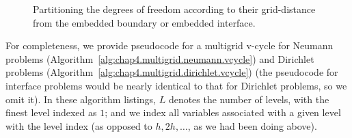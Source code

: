 \setlength{\figurewidth}{0.50\textwidth}
\begin{figure}[htbp]
\centering
{}
\caption{Partitioning the degrees of freedom according to their grid-distance from the embedded boundary or embedded interface.}
\label{fig:chap4.multigrid.boundaryinterfacedistance}
\end{figure}

For completeness, we provide pseudocode for a multigrid v-cycle for Neumann problems (Algorithm~\ref{alg:chap4.multigrid.neumann.vcycle}) and Dirichlet problems (Algorithm~\ref{alg:chap4.multigrid.dirichlet.vcycle}) (the pseudocode for interface problems would be nearly identical to that for Dirichlet problems, so we omit it). In these algorithm listings, $L$ denotes the number of levels, with the finest level indexed as $1$; and we index all variables associated with a given level with the level index (as opposed to $h, 2h, \dotsc$, as we had been doing above).


